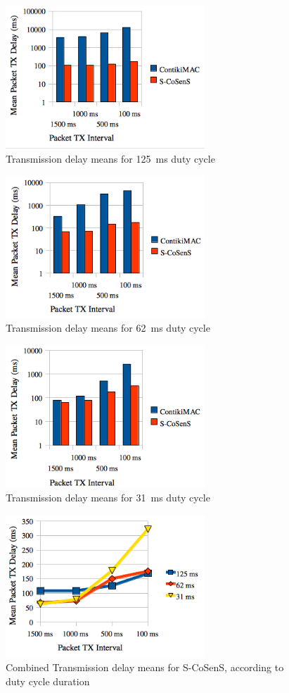 \documentclass[a4paper,twoside]{article}
\begin{document}
\begin{figure}
  \centering
  \includegraphics[width=7.5cm]{graphes/Delays8Hz.png}
  \caption{Transmission delay means for 125~ms duty cycle}
  \label{FigDelays8Hz}
\end{figure}
\begin{figure}
  \centering
  \includegraphics[width=7.5cm]{graphes/Delays16Hz.png}
  \caption{Transmission delay means for 62~ms duty cycle}
  \label{FigDelays16Hz}
\end{figure}
\begin{figure}
  \centering
  \includegraphics[width=7.5cm]{graphes/Delays32Hz.png}
  \caption{Transmission delay means for 31~ms duty cycle}
  \label{FigDelays32Hz}
\end{figure}
\begin{figure}
  \centering
  \includegraphics[width=7.5cm]{graphes/DelaysStabilitySCoSenS.png}
  \caption{Combined Transmission delay means for S-CoSenS,
           according to duty cycle duration}
  \label{FigDelaysSCoSenS}
\end{figure}
\end{document}
